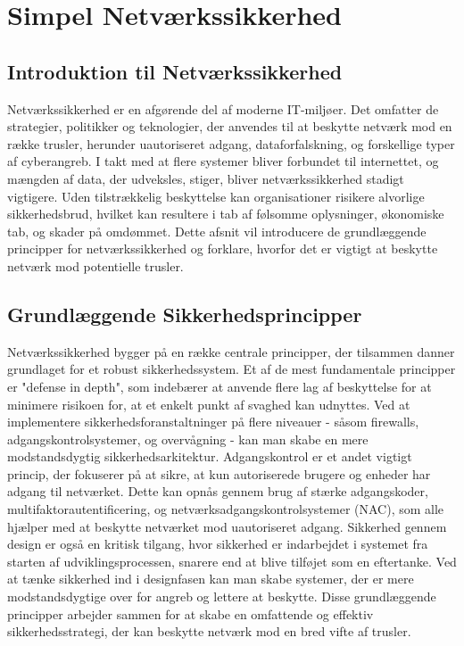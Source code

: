 \section{Simpel Netværkssikkerhed}

\subsection{Introduktion til Netværkssikkerhed}
Netværkssikkerhed er en afgørende del af moderne IT-miljøer. Det omfatter de strategier, politikker og teknologier, der anvendes til at beskytte netværk mod en række trusler, herunder uautoriseret adgang, dataforfalskning, og forskellige typer af cyberangreb. I takt med at flere systemer bliver forbundet til internettet, og mængden af data, der udveksles, stiger, bliver netværkssikkerhed stadigt vigtigere. Uden tilstrækkelig beskyttelse kan organisationer risikere alvorlige sikkerhedsbrud, hvilket kan resultere i tab af følsomme oplysninger, økonomiske tab, og skader på omdømmet. Dette afsnit vil introducere de grundlæggende principper for netværkssikkerhed og forklare, hvorfor det er vigtigt at beskytte netværk mod potentielle trusler.

\subsection{Grundlæggende Sikkerhedsprincipper}
Netværkssikkerhed bygger på en række centrale principper, der tilsammen danner grundlaget for et robust sikkerhedssystem. Et af de mest fundamentale principper er "defense in depth", som indebærer at anvende flere lag af beskyttelse for at minimere risikoen for, at et enkelt punkt af svaghed kan udnyttes. Ved at implementere sikkerhedsforanstaltninger på flere niveauer - såsom firewalls, adgangskontrolsystemer, og overvågning - kan man skabe en mere modstandsdygtig sikkerhedsarkitektur.
\newline\newline\noindent
Adgangskontrol er et andet vigtigt princip, der fokuserer på at sikre, at kun autoriserede brugere og enheder har adgang til netværket. Dette kan opnås gennem brug af stærke adgangskoder, multifaktorautentificering, og netværksadgangskontrolsystemer (NAC), som alle hjælper med at beskytte netværket mod uautoriseret adgang.
\newline\newline\noindent
Sikkerhed gennem design er også en kritisk tilgang, hvor sikkerhed er indarbejdet i systemet fra starten af udviklingsprocessen, snarere end at blive tilføjet som en eftertanke. Ved at tænke sikkerhed ind i designfasen kan man skabe systemer, der er mere modstandsdygtige over for angreb og lettere at beskytte.
\newline\newline\noindent
Disse grundlæggende principper arbejder sammen for at skabe en omfattende og effektiv sikkerhedsstrategi, der kan beskytte netværk mod en bred vifte af trusler.


